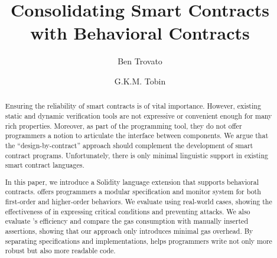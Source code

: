 \documentclass[sigconf,review,anonymous]{acmart}
\begin{document}

\title{Consolidating Smart Contracts with Behavioral Contracts}

\author{Ben Trovato}
\author{G.K.M. Tobin}
\authornotemark[1]

\iffalse
\lstMakeShortInline[keywordstyle=,%
  flexiblecolumns=false,%
  mathescape=false,%
  basicstyle=\ttfamily\small]@
\fi

\begin{abstract}
  Ensuring the reliability of smart contracts is of vital importance.
  However, existing static and dynamic verification tools are not expressive 
  or convenient enough for many rich properties.
  Moreover, as part of the programming tool, they do not offer programmers a notion 
  to articulate the interface between components.
  We argue that the ``design-by-contract'' approach should complement the development
  of smart contract programs. Unfortunately, there is only minimal linguistic support
  in existing smart contract languages.

  In this paper, we introduce a Solidity language extension \lang that supports
  behavioral contracts. \lang offers programmers a modular specification
  and monitor system for both first-order and higher-order behaviors. %
  We evaluate \lang using \numCaseStudied real-world cases, showing 
  the effectiveness of \lang 
  in expressing critical conditions and preventing attacks.
  We also evaluate \lang's efficiency and compare the gas consumption with manually inserted assertions,
  showing that our approach only introduces minimal gas overhead.
  By separating specifications and implementations, \lang helps programmers 
  write not only more robust but also more readable code.
  
  
\end{abstract}
\end{document}
